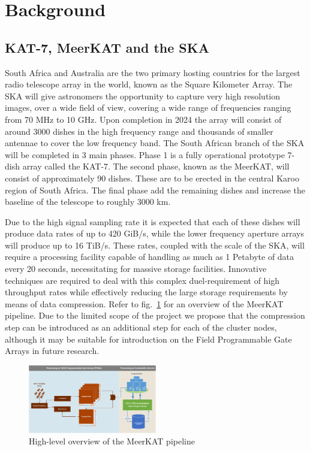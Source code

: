 \documentclass{acm_proc_article-sp}
\begin{document}
\section{Background}
\subsection{KAT-7, MeerKAT and the SKA}
South Africa and Australia are the two primary hosting countries for the largest radio telescope array in the world, known as the Square Kilometer Array. 
The SKA will give astronomers the opportunity to capture very high resolution images, over a wide field of view, covering a wide range of frequencies ranging 
from 70 MHz to 10 GHz. Upon completion in 2024 the array will consist of around 3000 dishes in the high frequency range and thousands of smaller antennae to 
cover the low frequency band. The South African branch of the SKA will be completed in 3 main phases. Phase 1 is a fully operational prototype 7-dish array 
called the KAT-7. The second phase, known as the MeerKAT, will consist of approximately 90 dishes. These are to be erected in the central Karoo region of South Africa. 
The final phase add the remaining dishes and increase the baseline of the telescope to roughly 3000 km.

Due to the high signal sampling rate it is expected that each of these dishes will produce data rates of up to 420 GiB/s, while the lower frequency aperture arrays 
will produce up to 16 TiB/s. These rates, coupled with the scale of the SKA, will require a processing facility capable of handling as much as 1 Petabyte of 
data every 20 seconds, necessitating for massive storage facilities. Innovative techniques are required to deal with this complex duel-requirement of high 
throughput rates while effectively reducing the large storage requirements by means of data compression. Refer to fig.~\ref{MeerKAT_PIPELINE} for an overview of
the MeerKAT pipeline. Due to the limited scope of the project we propose that the compression step can be introduced as an additional step for each of the cluster
nodes, although it may be suitable for introduction on the Field Programmable Gate Arrays in future research.
\begin{figure}[h!]
 \centering
 \includegraphics[width=0.50\textwidth]{Process.png}
 \caption{High-level overview of the MeerKAT pipeline}
 \label{MeerKAT_PIPELINE}
\end{figure}
\end{document}
